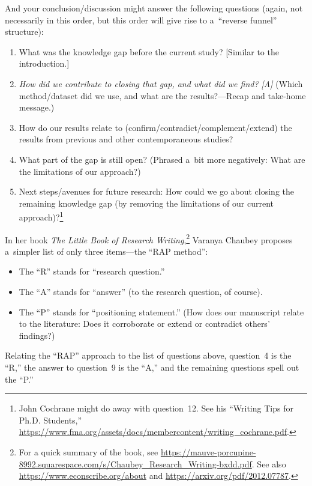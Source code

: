 \documentclass[11pt, a4paper, oneside]{article}
\theoremstyle{Plain}
\theoremstyle{Definition}
\theoremstyle{Remark}
\begin{document}
And your conclusion/discussion might answer the following questions (again, not necessarily in this order, but this order will give rise to a~``reverse funnel'' structure):
\begin{enumerate}[resume, labelindent = \parindent, leftmargin = 2\parindent]
	\item What was the knowledge gap before the current study? [Similar to the introduction.]
	\item \emph{How did we contribute to closing that gap, and what did we find? [A]} (Which method\slash dataset did we use, and what are the results?---Recap and take-home message.)
	\item How do our results relate to (confirm\slash contradict\slash complement\slash extend) the results from previous and other contemporaneous studies?
	\item What part of the gap is still open? (Phrased a~bit more negatively: What are the limitations of our approach?)
	\item Next steps\slash avenues for future research: How could we go about closing the remaining knowledge gap (by removing the limitations of our current approach)?\footnote{John Cochrane might do away with question~12. See his ``Writing Tips for Ph.D. Students,'' \url{https://www.fma.org/assets/docs/membercontent/writing_cochrane.pdf}.}
\end{enumerate}

In her book \textit{The Little Book of Research Writing},\footnote{For a quick summary of the book, see \url{https://mauve-porcupine-8992.squarespace.com/s/Chaubey_Research_Writing-bxdd.pdf}. See also \url{https://www.econscribe.org/about} and \url{https://arxiv.org/pdf/2012.07787}.} Varanya Chaubey proposes a~simpler list of only three items---the ``RAP method'':
\begin{itemize}
	\item The ``R'' stands for ``research question.''
	\item The ``A'' stands for ``answer'' (to the research question, of course).
	\item The ``P'' stands for ``positioning statement.'' (How does our manuscript relate to the literature: Does it corroborate or extend or contradict others' findings?)
\end{itemize}

Relating the ``RAP'' approach to the list of questions above, question~4 is the ``R,'' the answer to question~9 is the ``A,'' and the remaining questions spell out the ``P.''
\end{document}
